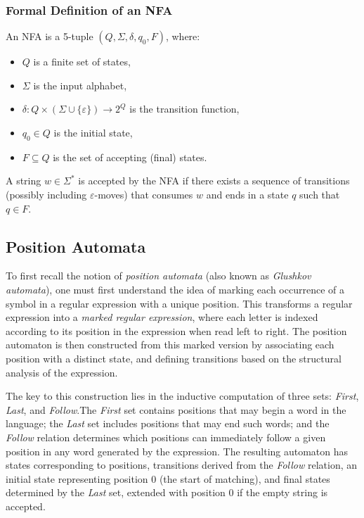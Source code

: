 \subsubsection*{Formal Definition of an NFA}

An NFA is a 5-tuple $(Q, \Sigma, \delta, q_0, F)$, where:

\begin{itemize}
    \item $Q$ is a finite set of states,
    \item $\Sigma$ is the input alphabet,
    \item $\delta: Q \times (\Sigma \cup \{\varepsilon\}) \rightarrow 2^Q$ is the transition function,
    \item $q_0 \in Q$ is the initial state,
    \item $F \subseteq Q$ is the set of accepting (final) states.
\end{itemize}

A string $w \in \Sigma^*$ is accepted by the NFA if there exists a sequence of transitions (possibly including $\varepsilon$-moves) that consumes $w$ and ends in a state $q$ such that $q \in F$.

\subsection{Position Automata}
To first recall the notion of \emph{position automata} (also known as \emph{Glushkov automata}), one must first understand the idea of marking each occurrence of a symbol in a regular expression with a unique position. This transforms a regular expression into a \emph{marked regular expression}, where each letter is indexed according to its position in the expression when read left to right. The position automaton is then constructed from this marked version by associating each position with a distinct state, and defining transitions based on the structural analysis of the expression. \cite{mesh-of-automata}

The key to this construction lies in the inductive computation of three sets: \emph{First}, \emph{Last}, and \emph{Follow}.The \emph{First} set contains positions that may begin a word in the language; the \emph{Last} set includes positions that may end such words; and the \emph{Follow} relation determines which positions can immediately follow a given position in any word generated by the expression. The resulting automaton has states corresponding to positions, transitions derived from the \emph{Follow} relation, an initial state representing position 0 (the start of matching), and final states determined by the \emph{Last} set, extended with position 0 if the empty string is accepted. \cite{mesh-of-automata}

